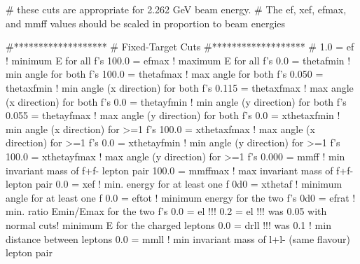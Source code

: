 # these cuts are appropriate for 2.262 GeV beam energy.  
# The ef, xef, efmax, and mmff values should be scaled in proportion to beam energies

#*******************                                                 
# Fixed-Target Cuts
#*******************                                                 
#
 1.0 = ef        ! minimum E for all f's
 100.0 = efmax     ! maximum E for all f's
 0.0 = thetafmin ! min angle for both f's
 100.0 = thetafmax ! max angle for both f's
 0.050 = thetaxfmin ! min angle (x direction) for both f's
 0.115 = thetaxfmax ! max angle (x direction) for both f's 
 0.0 = thetayfmin ! min angle (y direction) for both f's
 0.055 = thetayfmax ! max angle (y direction) for both f's 
 0.0 = xthetaxfmin ! min angle (x direction) for >=1 f's
 100.0 = xthetaxfmax ! max angle (x direction) for >=1 f's 
 0.0 = xthetayfmin ! min angle (y direction) for >=1 f's
 100.0 = xthetayfmax ! max angle (y direction) for >=1 f's 
 0.000 = mmff      ! min invariant mass of f+f- lepton pair
 100.0 = mmffmax  ! max invariant mass of f+f- lepton pair
 0.0 = xef       ! min. energy for at least one f
 0d0 = xthetaf   ! minimum angle for at least one f
 0.0 = eftot     ! minimum energy for the two f's
 0d0 = efrat     ! min. ratio Emin/Emax for the two f's
 0.0  = el     !!! 0.2 = el  !!! was 0.05 with normal cuts! minimum E for the charged leptons 
 0.0  = drll  !!! was 0.1  ! min distance between leptons 
 0.0  = mmll    ! min invariant mass of l+l- (same flavour) lepton pair
